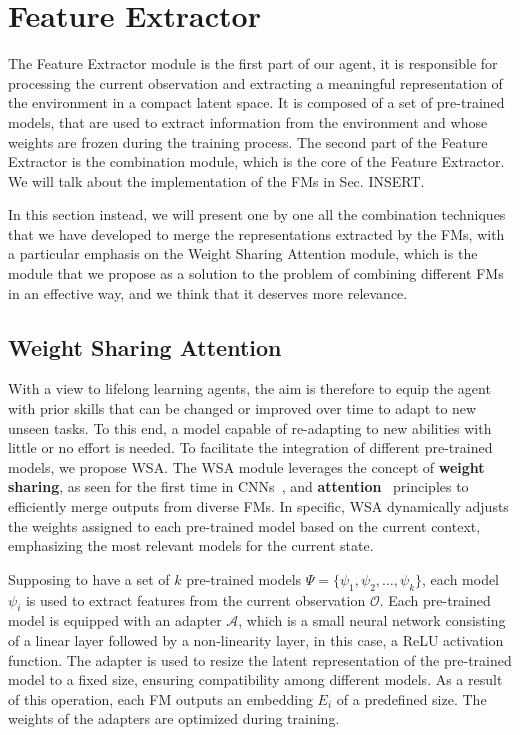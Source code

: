 \section{Feature Extractor} \label{sec:feature_extractor}
The Feature Extractor module is the first part of our agent, it is responsible for processing the current observation and extracting a meaningful representation of the environment in a compact latent space.
It is composed of a set of pre-trained models, that are used to extract information from the environment and whose weights are frozen during the training process.
The second part of the Feature Extractor is the combination module, which is the core of the Feature Extractor.
We will talk about the implementation of the FMs in Sec. INSERT.

In this section instead, we will present one by one all the combination techniques that we have developed to merge the representations extracted by the FMs, with a particular emphasis on the Weight Sharing Attention module, which is the module that we propose as a solution to the problem of combining different FMs in an effective way, and we think that it deserves more relevance.


\subsection{Weight Sharing Attention}
\label{sec:wsa}

With a view to lifelong learning agents, the aim is therefore to equip the agent with prior skills that can be changed or improved over time to adapt to new unseen tasks.
To this end, a model capable of re-adapting to new abilities with little or no effort is needed.
To facilitate the integration of different pre-trained models, we propose WSA\@.
The WSA module leverages the concept of \textbf{weight sharing}, as seen for the first time in CNNs~\citep{fukushima1980neocognitron}, and \textbf{attention}~\citep{vaswani2017attention} principles to efficiently merge outputs from diverse FMs.
In specific, WSA dynamically adjusts the weights assigned to each pre-trained model based on the current context, emphasizing the most relevant models for the current state.

Supposing to have a set of $k$ pre-trained models $\Psi = \{\psi_1, \psi_2, \ldots, \psi_k\}$, each model $\psi_i$ is used to extract features from the current observation $\mathcal{O}$.
Each pre-trained model is equipped with an adapter $\mathcal{A}$, which is a small neural network consisting of a linear layer followed by a non-linearity layer, in this case, a ReLU activation function.
The adapter is used to resize the latent representation of the pre-trained model to a fixed size, ensuring compatibility among different models.
As a result of this operation, each FM outputs an embedding $E_i$ of a predefined size.
The weights of the adapters are optimized during training.

